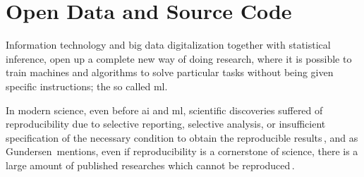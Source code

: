 \section{Open Data and Source Code}
%
Information technology and big data digitalization together with statistical inference,
open up a complete new way of doing research, where it is possible to train machines
and algorithms to solve particular tasks without being given specific instructions; the so called
\ac{ml}.

In modern science, even before \ac{ai} and \ac{ml}, scientific discoveries suffered of reproducibility due
to selective reporting, selective analysis, or insufficient specification of the necessary condition to obtain the
reproducible results\,\cite{aarts2016reproducibility}, and as Gundersen\,\cite{gundersen2018state}
mentions, even if reproducibility is a cornerstone of science, there is a large amount of published
researches which cannot be reproduced\,\cite{begley2012drug, begley2015reproducibility, prinz2011believe}.

